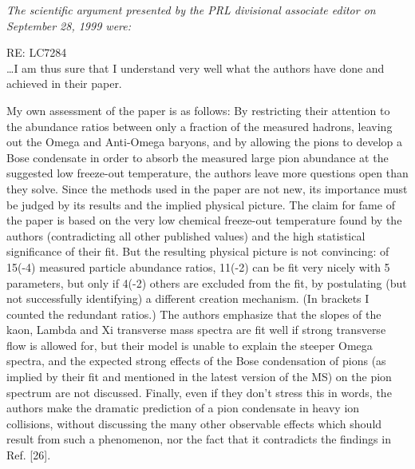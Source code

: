 \noindent \textit{The scientific argument presented  by the PRL  divisional associate editor on September 28, 1999 were:}\\[-0.7cm]
%
\begin{mdframed}[linecolor=gray,roundcorner=12pt,backgroundcolor=GreenYellow!15,linewidth=1pt,leftmargin=0cm,rightmargin=0cm,topline=true,bottomline=true,skipabove=12pt]\relax%
%
RE: LC7284\\
\ldots  I am thus sure that I understand very well what the authors have done and achieved in their paper.

My own assessment of the paper is as follows: By restricting their attention to the abundance ratios between only a fraction of the measured hadrons, leaving out the Omega and Anti-Omega baryons, and by allowing the pions to develop a Bose condensate in order to absorb the measured large pion abundance at the suggested low freeze-out temperature, the authors leave more questions open than they solve. Since the methods used in the paper are not new, its importance must be judged by its results and the implied physical picture. The claim for fame of the paper is based on the very low chemical freeze-out temperature found by the authors (contradicting all other published values) and the high statistical significance of their fit. But the resulting physical picture is not convincing: of 15(-4) measured particle abundance ratios, 11(-2) can be fit very nicely with 5 parameters, but only if 4(-2) others are excluded from the fit, by postulating (but not successfully identifying) a different creation mechanism. (In brackets I counted the redundant ratios.) The authors emphasize that the slopes of the kaon, Lambda and Xi transverse mass spectra are fit well if strong transverse flow is allowed for, but their model is unable to explain the steeper Omega spectra, and the expected strong effects of the Bose condensation of pions (as implied by their fit and mentioned in the latest version of the MS) on the pion spectrum are not discussed. Finally, even if they don't stress this in words, the authors make the dramatic prediction of a pion condensate in heavy ion collisions,  without discussing the many other observable effects which should result from such a phenomenon, nor the fact that it contradicts the findings in Ref. [26]. 
  
\end{mdframed}
\vskip 0.5cm

